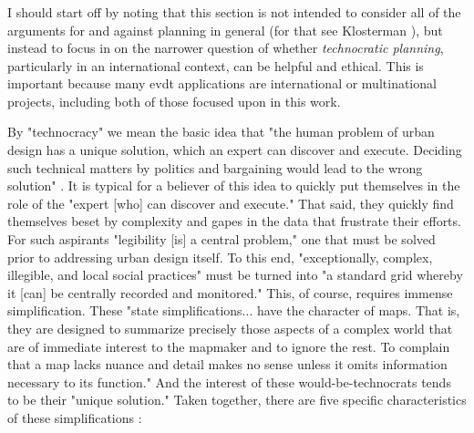 




\subsubsection{} \label{sec:technocracy}

I should start off by noting that this section is not intended to consider all of the arguments for and against planning in general (for that see Klosterman \cite{klostermanArgumentsPlanning1985}), but instead to focus in on the narrower question of whether \textit{technocratic planning}, particularly in an international context, can be helpful and ethical. This is important because many \ac{evdt} applications are international or multinational projects, including both of those focused upon in this work.

By "technocracy" we mean the basic idea that "the human problem of urban design has a unique solution, which an expert can discover and execute. Deciding such technical matters by politics and bargaining would lead to the wrong solution" \cite{scottSeeingStateHow2020}. It is typical for a believer of this idea to quickly put themselves in the role of the "expert [who] can discover and execute." That said, they quickly find themselves beset by complexity and gapes in the data that frustrate their efforts. For such aspirants "legibility [is] a central problem," one that must be solved prior to addressing urban design itself. To this end, "exceptionally, complex, illegible, and local social practices" must be turned into "a standard grid whereby it [can] be centrally recorded and monitored." This, of course, requires immense simplification. These "state simplifications... have the character of maps. That is, they are designed to summarize precisely those aspects of a complex world that are of immediate interest to the mapmaker and to ignore the rest. To complain that a map lacks nuance and detail makes no sense unless it omits information necessary to its function." And the interest of these would-be-technocrats tends to be their "unique solution." Taken together, there are five specific characteristics of these simplifications \cite{scottSeeingStateHow2020}:

